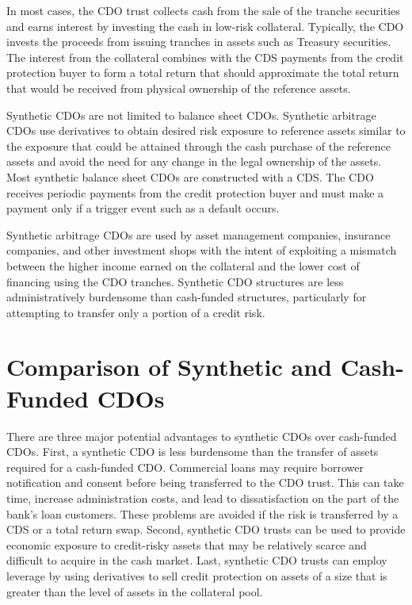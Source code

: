 \documentclass[11pt]{article}
\begin{document}
In most cases, the CDO trust collects cash from the sale of the tranche securities and earns interest by investing the cash in low-risk collateral. Typically, the CDO invests the proceeds from issuing tranches in assets such as Treasury securities. The interest from the collateral combines with the CDS payments from the credit protection buyer to form a total return that should approximate the total return that would be received from physical ownership of the reference assets.

Synthetic CDOs are not limited to balance sheet CDOs. Synthetic arbitrage CDOs use derivatives to obtain desired risk exposure to reference assets similar to the exposure that could be attained through the cash purchase of the reference assets and avoid the need for any change in the legal ownership of the assets. Most synthetic balance sheet CDOs are constructed with a CDS. The CDO receives periodic payments from the credit protection buyer and must make a payment only if a trigger event such as a default occurs.

Synthetic arbitrage CDOs are used by asset management companies, insurance companies, and other investment shops with the intent of exploiting a mismatch between the higher income earned on the collateral and the lower cost of financing using the CDO tranches. Synthetic CDO structures are less administratively burdensome than cash-funded structures, particularly for attempting to transfer only a portion of a credit risk.

\section*{Comparison of Synthetic and Cash-Funded CDOs}
There are three major potential advantages to synthetic CDOs over cash-funded CDOs. First, a synthetic CDO is less burdensome than the transfer of assets required for a cash-funded CDO. Commercial loans may require borrower notification and consent before being transferred to the CDO trust. This can take time, increase administration costs, and lead to dissatisfaction on the part of the bank's loan customers. These problems are avoided if the risk is transferred by a CDS or a total return swap. Second, synthetic CDO trusts can be used to provide economic exposure to credit-risky assets that may be relatively scarce and difficult to acquire in the cash market. Last, synthetic CDO trusts can employ leverage by using derivatives to sell credit protection on assets of a size that is greater than the level of assets in the collateral pool.
\end{document}
